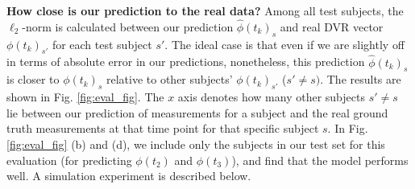 \documentclass{article}
\begin{document}

\textbf{How close is our prediction to the real data? }
Among all test subjects, the $\ell_2$-norm is calculated between our prediction $\hat{\phi}(t_k)_s$ and real DVR vector $\phi(t_k)_{s'}$ for
each test subject $s'$. The ideal case is that even if we are slightly off in terms of absolute error in our predictions, nonetheless, this 
 prediction $\hat{\phi}(t_k)_s$ is closer to $\phi(t_k)_s$ relative to other subjects' $\phi(t_k)_{s'}$ ($s' \neq s)$. 
 The results are shown in Fig. \ref{fig:eval_fig}. The $x$ axis denotes how many other subjects $s'\neq s$
 lie between our prediction of measurements for a subject and the real ground truth measurements 
 at that time point for that specific subject $s$.
 In Fig. \ref{fig:eval_fig} (b) and (d), we include only the subjects in our test set for this evaluation (for predicting $\phi(t_2)$ and $\phi(t_3)$),
 and find that the model performs well. A simulation experiment is described below. 
 

 
\end{document}
